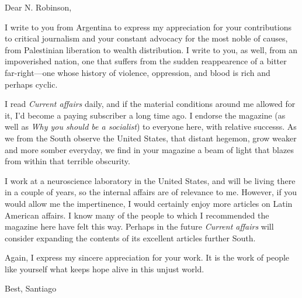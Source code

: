 \documentclass[a4paper, 12pt]{article}
\begin{document}
    
Dear N. Robinson,

I write to you from Argentina to express my appreciation for your contributions
to critical journalism and your constant advocacy for the most noble of causes,
from Palestinian liberation to wealth distribution. I write to you, as well,
from an impoverished nation, one that suffers from the sudden reappearence of
a bitter far-right---one whose history of violence, oppression, and
blood is rich and perhaps cyclic.

I read \textit{Current affairs} daily, and if the material conditions around me
allowed for it, I'd become a paying subscriber a long time ago. I
endorse the magazine (as well as \textit{Why you should be a socialist}) to
everyone here, with relative successs. As we from the South observe the United
States, that distant hegemon, grow weaker and more somber everyday, we find in
your magazine a beam of light that blazes from within that terrible
obscurity.

I work at a neuroscience laboratory in the United States, and will be living
there in a couple of years, so the internal affairs are of relevance to me.
However, if you would allow me the impertinence, I would certainly enjoy more
articles on Latin American affairs. I know many of the people to which I
recommended the magazine here have felt this way. Perhaps in the future \textit{Current affairs}
will consider expanding the contents of its excellent articles further South. 

Again, I express my sincere appreciation for your work. It is the work of people
like yourself what keeps hope alive in this unjust world. 

Best,
Santiago
\end{document}
